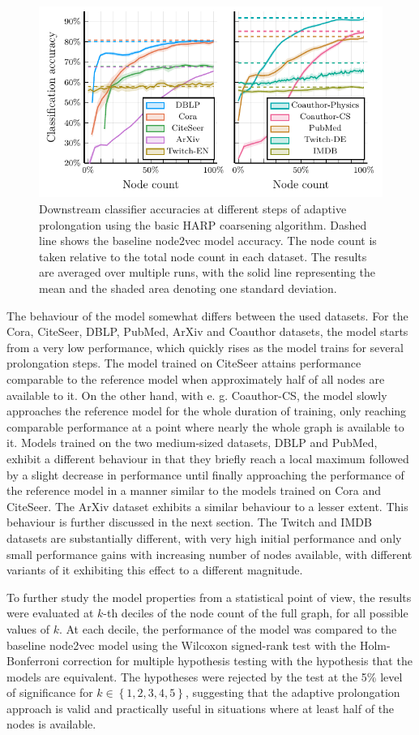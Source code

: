\begin{figure}
  \centering
  \includegraphics[width = 0.75\linewidth]{images/adaptive-coarsening/adaptive-coarsening.pdf}
  \caption{Downstream classifier accuracies at different steps of adaptive prolongation using the basic HARP coarsening algorithm. Dashed line shows the baseline node2vec model accuracy. The node count is taken relative to the total node count in each dataset. The results are averaged over multiple runs, with the solid line representing the mean and the shaded area denoting one standard deviation.}
  \label{fig:adaptive-coarsening}
\end{figure}

The behaviour of the model somewhat differs between the used datasets. For the Cora, CiteSeer, DBLP, PubMed, ArXiv and Coauthor datasets, the model starts from a very low performance, which quickly rises as the model trains for several prolongation steps. The model trained on CiteSeer attains performance comparable to the reference model when approximately half of all nodes are available to it. On the other hand, with e. g. Coauthor-CS, the model slowly approaches the reference model for the whole duration of training, only reaching comparable performance at a point where nearly the whole graph is available to it. Models trained on the two medium-sized datasets, DBLP and PubMed, exhibit a different behaviour in that they briefly reach a local maximum followed by a slight decrease in performance until finally approaching the performance of the reference model in a manner similar to the models trained on Cora and CiteSeer. The ArXiv dataset exhibits a similar behaviour to a lesser extent. This behaviour is further discussed in the next section. The Twitch and IMDB datasets are substantially different, with very high initial performance and only small performance gains with increasing number of nodes available, with different variants of it exhibiting this effect to a different magnitude.

To further study the model properties from a statistical point of view, the results were evaluated at \( k \)-th deciles of the node count of the full graph, for all possible values of \( k \). At each decile, the performance of the model was compared to the baseline node2vec model using the Wilcoxon signed-rank test with the Holm-Bonferroni correction for multiple hypothesis testing with the hypothesis that the models are equivalent. The hypotheses were rejected by the test at the 5\% level of significance for \( k \in \left\{ 1, 2, 3, 4, 5 \right\} \), suggesting that the adaptive prolongation approach is valid and practically useful in situations where at least half of the nodes is available.

